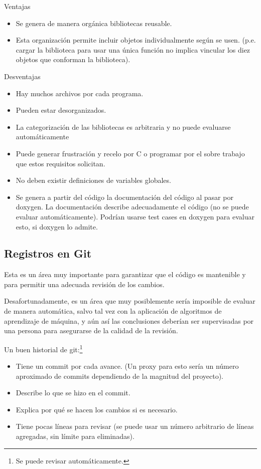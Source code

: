 \documentclass[
  12,
]{scrartcl}
\providecommand{\tightlist}{%
  \setlength{\itemsep}{0pt}\setlength{\parskip}{0pt}}
\begin{document}
Ventajas

\begin{itemize}
\item
  Se genera de manera orgánica bibliotecas reusable.
\item
  Esta organización permite incluir objetos individualmente según se
  usen. (p.e. cargar la biblioteca para usar una única función no
  implica vincular los diez objetos que conforman la biblioteca).
\end{itemize}

Desventajas

\begin{itemize}
\item
  Hay muchos archivos por cada programa.
\item
  Pueden estar desorganizados.
\item
  La categorización de las bibliotecas es arbitraria y no puede
  evaluarse automáticamente
\item
  Puede generar frustración y recelo por C o programar por el sobre
  trabajo que estos requisitos solicitan.
\item
  No deben existir definiciones de variables globales.
\item
  Se genera a partir del código la documentación del código al pasar por
  doxygen. La documentación describe adecuadamente el código (no se
  puede evaluar automáticamente). Podrían usarse test cases en doxygen
  para evaluar esto, si doxygen lo admite.
\end{itemize}

\hypertarget{registros-en-git}{%
\subsection{Registros en Git}\label{registros-en-git}}

Esta es un área muy importante para garantizar que el código es
mantenible y para permitir una adecuada revisión de los cambios.

Desafortunadamente, es un área que muy posiblemente sería imposible de
evaluar de manera automática, salvo tal vez con la aplicación de
algoritmos de aprendizaje de máquina, y aún así las conclusiones
deberían ser supervisadas por una persona para asegurarse de la calidad
de la revisión.

Un buen historial de git:\footnote{Se puede revisar automáticamente.}

\begin{itemize}
\tightlist
\item
  Tiene un commit por cada avance. (Un proxy para esto sería un número
  aproximado de commits dependiendo de la magnitud del proyecto).
\item
  Describe lo que se hizo en el commit.
\item
  Explica por qué se hacen los cambios si es necesario.
\item
  Tiene pocas líneas para revisar (se puede usar un número arbitrario de
  líneas agregadas, sin límite para eliminadas).
\end{itemize}
\end{document}
